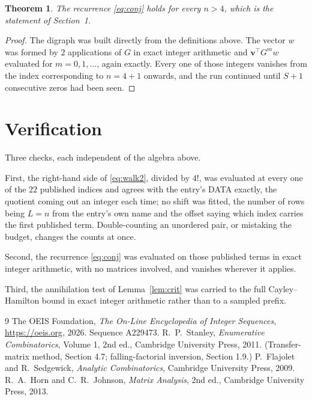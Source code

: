 \documentclass[11pt,a4paper]{article}
\theoremstyle{plain}
\newtheorem{theorem}{Theorem}
\theoremstyle{definition}
\begin{document}
\begin{theorem}
The recurrence \eqref{eq:conj} holds for every $n>4$, which is the statement of
Section~1.
\end{theorem}

\begin{proof}
The digraph was built directly from the definitions above. The vector $w$ was formed by
$2$ applications of $G$ in exact integer arithmetic and $\mathbf{v}^{\!\top}G^{m}w$
evaluated for $m=0,1,\dots$, again exactly. Every one of those integers vanishes from the
index corresponding to $n=4+1$ onwards, and the run continued until $S+1$ consecutive
zeros had been seen.
\end{proof}

\section{Verification}

Three checks, each independent of the algebra above.

First, the right-hand side of \eqref{eq:walk2}, divided by $4!$, was evaluated at every
one of the $22$ published indices and agrees with the entry's DATA exactly, the quotient
coming out an integer each time; no shift was fitted, the number of rows being $L=n$
from the entry's own name and the offset saying which index carries the first published term.
Double-counting an unordered pair, or mistaking the budget, changes the counts at once.

Second, the recurrence \eqref{eq:conj} was evaluated on those published terms in exact
integer arithmetic, with no matrices involved, and vanishes wherever it applies.

Third, the annihilation test of Lemma~\ref{lem:crit} was carried to the full
Cayley--Hamilton bound in exact integer arithmetic rather than to a sampled prefix.

\begin{thebibliography}{9}
 The OEIS Foundation, \emph{The On-Line Encyclopedia of Integer
Sequences}, \url{https://oeis.org}, 2026. Sequence A229473.
 R.~P.~Stanley, \emph{Enumerative Combinatorics}, Volume 1, 2nd ed.,
Cambridge University Press, 2011. (Transfer-matrix method, Section 4.7; falling-factorial
inversion, Section 1.9.)
 P.~Flajolet and R.~Sedgewick, \emph{Analytic Combinatorics}, Cambridge
University Press, 2009.
 R.~A.~Horn and C.~R.~Johnson, \emph{Matrix Analysis}, 2nd ed., Cambridge
University Press, 2013.
\end{thebibliography}
\end{document}
